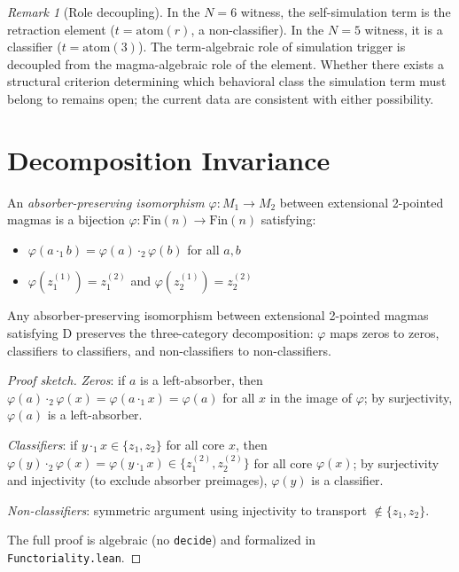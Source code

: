 \documentclass[sigconf,screen]{acmart}
\newcommand{\dotop}{\cdot}
\newcommand{\Fin}{\mathrm{Fin}}
\theoremstyle{remark}
\newtheorem{remark}{Remark}
\begin{document}
\begin{remark}[Role decoupling]
In the $N\!=\!6$ witness, the self-simulation term is the retraction element ($t = \text{atom}(r)$, a non-classifier). In the $N\!=\!5$ witness, it is a classifier ($t = \text{atom}(3)$). The term-algebraic role of simulation trigger is decoupled from the magma-algebraic role of the element. Whether there exists a structural criterion determining which behavioral class the simulation term must belong to remains open; the current data are consistent with either possibility.
\end{remark}

\section{Decomposition Invariance}
\label{sec:invariance}

\begin{definition}
An \emph{absorber-preserving isomorphism} $\varphi : M_1 \to M_2$ between extensional 2-pointed magmas is a bijection $\varphi : \Fin(n) \to \Fin(n)$ satisfying:
\begin{itemize}
  \item $\varphi(a \dotop_1 b) = \varphi(a) \dotop_2 \varphi(b)$ for all $a, b$
  \item $\varphi(z_1^{(1)}) = z_1^{(2)}$ and $\varphi(z_2^{(1)}) = z_2^{(2)}$
\end{itemize}
\end{definition}

\begin{theorem}[Functoriality]
\label{thm:functoriality}
Any absorber-preserving isomorphism between extensional 2-pointed magmas satisfying D preserves the three-category decomposition: $\varphi$ maps zeros to zeros, classifiers to classifiers, and non-classifiers to non-classifiers.
\end{theorem}

\begin{proof}[Proof sketch]
\emph{Zeros}: if $a$ is a left-absorber, then $\varphi(a) \dotop_2 \varphi(x) = \varphi(a \dotop_1 x) = \varphi(a)$ for all $x$ in the image of $\varphi$; by surjectivity, $\varphi(a)$ is a left-absorber.

\emph{Classifiers}: if $y \dotop_1 x \in \{z_1, z_2\}$ for all core $x$, then $\varphi(y) \dotop_2 \varphi(x) = \varphi(y \dotop_1 x) \in \{z_1^{(2)}, z_2^{(2)}\}$ for all core $\varphi(x)$; by surjectivity and injectivity (to exclude absorber preimages), $\varphi(y)$ is a classifier.

\emph{Non-classifiers}: symmetric argument using injectivity to transport $\notin \{z_1, z_2\}$.

The full proof is algebraic (no \texttt{decide}) and formalized in \texttt{Functoriality.lean}.
\end{proof}
\end{document}
